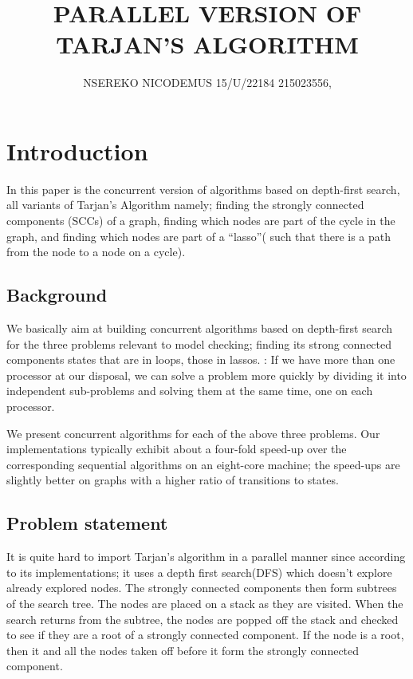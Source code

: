 \documentclass{article}
\title{PARALLEL VERSION OF TARJAN'S ALGORITHM}
\author{NSEREKO NICODEMUS   15/U/22184     215023556,    }
\begin{document}
\maketitle
\section{Introduction}{In this paper is the concurrent version of algorithms based on depth-first search, all variants of Tarjan’s Algorithm namely; finding the strongly connected components (SCCs) of a graph, finding which nodes are part of the cycle in the graph, and finding which nodes are part of a “lasso”( such that there is a path from the node to a node on a cycle).}
\subsection{Background}{We basically aim at building concurrent algorithms based on depth-first search \cite{ref2} for the three problems relevant to model checking; finding its strong connected components states that are in loops, those in lassos. : If we have more than one processor at our disposal, we can solve a problem more quickly by dividing it into independent sub-problems and solving them at the same time, one on each processor.}

{We present concurrent algorithms for each of the above three problems. Our implementations typically exhibit about a four-fold speed-up over the corresponding sequential algorithms on an eight-core machine; the speed-ups are slightly better on graphs with a higher ratio of transitions to states. }

\subsection{Problem statement}{It is quite hard to import Tarjan’s algorithm in a parallel manner since according to its implementations; it uses a depth first search(DFS) which doesn’t explore already explored nodes. The strongly connected components then form subtrees of the search tree. The nodes are placed on a stack as they are visited. When the search returns from the subtree, the nodes are popped off the stack and checked to see if they are a root of a strongly connected component. If the node is a root, then it and all the nodes taken off before it form the strongly connected component.}
\end{document}
